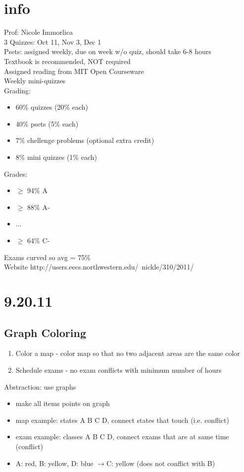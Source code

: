 \documentclass[a4paper]{article}
\newcommand{\ra}{$\rightarrow$}
\begin{document}
  \section{info}
	Prof: Nicole Immorlica\\
	3 Quizzes: Oct 11, Nov 3, Dec 1\\
	Psets: assigned weekly, due on week w/o quiz, should take 6-8 hours\\
	Textbook is recommended, NOT required\\
	Assigned reading from MIT Open Courseware\\
	Weekly mini-quizzes\\
	Grading:
	\begin{itemize}
	  \item 60\% quizzes (20\% each)
	  \item 40\% psets (5\% each)
      \item 7\% chellenge problems (optional extra credit)
      \item 8\% mini quizzes (1\% each)
	\end{itemize}
	Grades:
	\begin{itemize}
	  \item $\ge$ 94\% A
	  \item $\ge$ 88\% A-
	  \item ...
	  \item $\ge$ 64\% C-
	\end{itemize}
	Exams curved so avg = 75\%\\
	Website http://users.eecs.northwestern.edu/~nickle/310/2011/\\
  \section{9.20.11}
    \subsection{Graph Coloring}
      \begin{enumerate}
        \item Color a map - color map so that no two adjacent areas are the same color
        \item Schedule exams - no exam conflicts with minimum number of hours
      \end{enumerate}
      Abstraction: use graphs\\
      \begin{itemize}
        \item make all items points on graph
        \item map example: states A B C D, connect states that touch (i.e. conflict)
        \item exam example: classes A B C D, connect exams that are at same time (conflict)
        \item A: red, B: yellow, D: blue \ra C: yellow (does not conflict with B) 
      \end{itemize}
\end{document}
